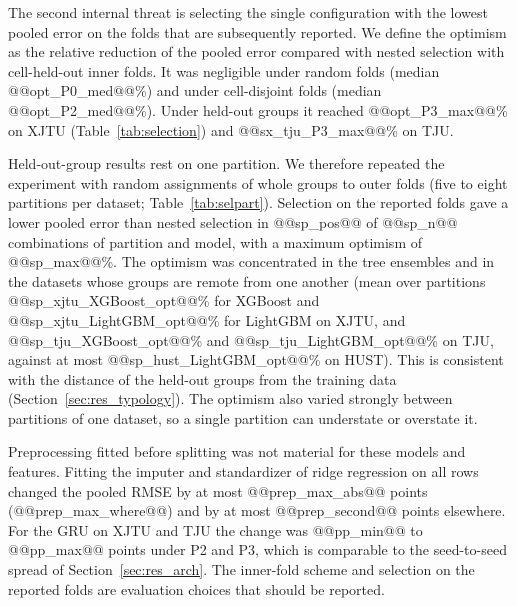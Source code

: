 \documentclass{ieeeaccess}
\newcommand{\fitwide}[1]{\footnotesize\resizebox{\ifdim\width>\textwidth\textwidth\else\width\fi}{!}{}}
\begin{document}
The second internal threat is selecting the single configuration with the lowest pooled error on the folds that are subsequently reported. We define the optimism as the relative reduction of the pooled error compared with nested selection with cell-held-out inner folds. It was negligible under random folds (median @@opt_P0_med@@\%) and under cell-disjoint folds (median @@opt_P2_med@@\%). Under held-out groups it reached @@opt_P3_max@@\% on XJTU (Table~\ref{tab:selection}) and @@sx_tju_P3_max@@\% on TJU.

Held-out-group results rest on one partition. We therefore repeated the experiment with random assignments of whole groups to outer folds (five to eight partitions per dataset; Table~\ref{tab:selpart}). Selection on the reported folds gave a lower pooled error than nested selection in @@sp_pos@@ of @@sp_n@@ combinations of partition and model, with a maximum optimism of @@sp_max@@\%. The optimism was concentrated in the tree ensembles and in the datasets whose groups are remote from one another (mean over partitions @@sp_xjtu_XGBoost_opt@@\% for XGBoost and @@sp_xjtu_LightGBM_opt@@\% for LightGBM on XJTU, and @@sp_tju_XGBoost_opt@@\% and @@sp_tju_LightGBM_opt@@\% on TJU, against at most @@sp_hust_LightGBM_opt@@\% on HUST). This is consistent with the distance of the held-out groups from the training data (Section~\ref{sec:res_typology}). The optimism also varied strongly between partitions of one dataset, so a single partition can understate or overstate it.
\begin{table}[!t]
\centering
\caption{P3-type evaluation with repeated random assignments of whole groups to outer folds: pooled RMSE (\% SOH; mean and standard deviation over partitions) with fixed hyperparameters, nested selection (group-held-out inner folds) and selection on the reported folds. Optimism is the relative reduction from the nested to the reported-fold selection, with its range over partitions; the last column counts partitions with a positive optimism.}
\label{tab:selpart}
\scriptsize
\fitwide{tables/selection_partitions.tex}
\end{table}

Preprocessing fitted before splitting was not material for these models and features. Fitting the imputer and standardizer of ridge regression on all rows changed the pooled RMSE by at most @@prep_max_abs@@ points (@@prep_max_where@@) and by at most @@prep_second@@ points elsewhere. For the GRU on XJTU and TJU the change was @@pp_min@@ to @@pp_max@@ points under P2 and P3, which is comparable to the seed-to-seed spread of Section~\ref{sec:res_arch}. The inner-fold scheme and selection on the reported folds are evaluation choices that should be reported.
\begin{table}[!t]
\centering
\caption{P3 pooled RMSE (\% SOH): fixed hyperparameters, nested selection and selection on the reported folds. Optimism is the relative reduction from nested selection with cell-held-out inner folds to selection on the reported folds.}
\label{tab:selection}
\scriptsize
\fitwide{tables/selection.tex}
\end{table}
\end{document}
